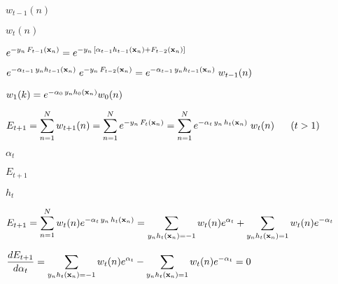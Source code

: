 \documentclass{article}
\def\lthtmlcheckvsize{\ifdim\ht\sizebox<\vsize 
  \ifdim\wd\sizebox<\hsize\expandafter\hfill\fi \expandafter\vfill
  \else\expandafter\vss\fi}%
\begin{document}
{\newpage\clearpage
{}%
$ w_{t-1}(n)$%
\lthtmlindisplaymathZ
\lthtmlcheckvsize\clearpage}

{\newpage\clearpage
{}%
$\displaystyle w_t(n)$%
\lthtmlindisplaymathZ
\lthtmlcheckvsize\clearpage}

{\newpage\clearpage
{}%
$\displaystyle e^{-y_n\,F_{t-1}({\bf x}_n)}
=e^{-y_n\,[\alpha_{t-1}h_{t-1}({\bf x}_n)+F_{t-2}({\bf x}_n)]}$%
\lthtmlindisplaymathZ
\lthtmlcheckvsize\clearpage}

{\newpage\clearpage
{}%
$\displaystyle e^{-\alpha_{t-1}\,y_nh_{t-1}({\bf x}_n)}\;e^{-y_n\,F_{t-2}({\bf x}_n)}
=e^{-\alpha_{t-1}\,y_nh_{t-1}({\bf x}_n)}\;w_{t-1}(n)$%
\lthtmlindisplaymathZ
\lthtmlcheckvsize\clearpage}

{\newpage\clearpage
{}%
$ w_1(k)=e^{-\alpha_0 \,y_nh_0({\bf x}_n)}w_0(n)$%
\lthtmlindisplaymathZ
\lthtmlcheckvsize\clearpage}

{\newpage\clearpage
{}%
$\displaystyle E_{t+1}=\sum_{n=1}^N w_{t+1}(n)=\sum_{n=1}^N e^{-y_n\,F_t({\bf x}_n)}
=\sum_{n=1}^N e^{-\alpha_t\,y_n\, h_t({\bf x}_n)} \;w_t(n)
\;\;\;\;\;\;(t>1)$%
\lthtmlindisplaymathZ
\lthtmlcheckvsize\clearpage}

{\newpage\clearpage
{}%
$ \alpha_t$%
\lthtmlindisplaymathZ
\lthtmlcheckvsize\clearpage}

{\newpage\clearpage
{}%
$ E_{t+1}$%
\lthtmlindisplaymathZ
\lthtmlcheckvsize\clearpage}

{\newpage\clearpage
{}%
$ h_t$%
\lthtmlindisplaymathZ
\lthtmlcheckvsize\clearpage}

{\newpage\clearpage
{}%
$\displaystyle E_{t+1}=\sum_{n=1}^N w_t(n)e^{-\alpha_t \,y_n\,h_t({\bf x}_n)}
=\sum_{y_n h_t({\bf x}_n)=-1} w_t(n)e^{\alpha_t}
+\sum_{y_n h_t({\bf x}_n)=1} w_t(n)e^{-\alpha_t}$%
\lthtmlindisplaymathZ
\lthtmlcheckvsize\clearpage}

{\newpage\clearpage
{}%
$\displaystyle \frac{dE_{t+1}}{d\alpha_t}
=\sum_{y_n h_t({\bf x}_n)=-1} w_t(n) e^{\alpha_t}
-\sum_{y_n h_t({\bf x}_n)=1} w_t(n) e^{-\alpha_t}=0$%
\lthtmlindisplaymathZ
\lthtmlcheckvsize\clearpage}
\end{document}
